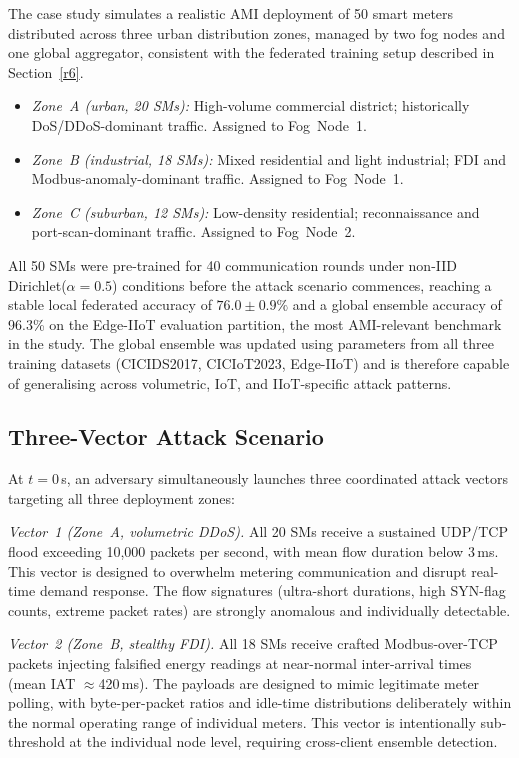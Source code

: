 \documentclass[sensors,article,submit,pdftex,moreauthors]{Definitions/mdpi}
\begin{document}
The case study simulates a realistic AMI deployment of 50 smart meters distributed across three urban distribution zones, managed by two fog nodes and one global aggregator, consistent with the federated training setup described in Section~\ref{r6}.

\begin{itemize}
  \item \textit{Zone~A (urban, 20 SMs):} High-volume commercial district; historically DoS/DDoS-dominant traffic. Assigned to Fog~Node~1.
  \item \textit{Zone~B (industrial, 18 SMs):} Mixed residential and light industrial; FDI and Modbus-anomaly-dominant traffic. Assigned to Fog~Node~1.
  \item \textit{Zone~C (suburban, 12 SMs):} Low-density residential; reconnaissance and port-scan-dominant traffic. Assigned to Fog~Node~2.
\end{itemize}

All 50 SMs were pre-trained for 40 communication rounds under non-IID Dirichlet($\alpha{=}0.5$) conditions before the attack scenario commences, reaching a stable local federated accuracy of $76.0{\pm}0.9\%$ and a global ensemble accuracy of 96.3\% on the Edge-IIoT evaluation partition, the most AMI-relevant benchmark in the study. The global ensemble was updated using parameters from all three training datasets (CICIDS2017, CICIoT2023, Edge-IIoT) and is therefore capable of generalising across volumetric, IoT, and IIoT-specific attack patterns.

\subsection{Three-Vector Attack Scenario}

At $t{=}0$\,s, an adversary simultaneously launches three coordinated attack vectors targeting all three deployment zones:

\noindent\textit{Vector~1 (Zone~A, volumetric DDoS).} All 20 SMs receive a sustained UDP/TCP flood exceeding 10,000 packets per second, with mean flow duration below 3\,ms. This vector is designed to overwhelm metering communication and disrupt real-time demand response. The flow signatures (ultra-short durations, high SYN-flag counts, extreme packet rates) are strongly anomalous and individually detectable.

\noindent\textit{Vector~2 (Zone~B, stealthy FDI).} All 18 SMs receive crafted Modbus-over-TCP packets injecting falsified energy readings at near-normal inter-arrival times (mean IAT $\approx$420\,ms). The payloads are designed to mimic legitimate meter polling, with byte-per-packet ratios and idle-time distributions deliberately within the normal operating range of individual meters. This vector is intentionally sub-threshold at the individual node level, requiring cross-client ensemble detection.
\end{document}
